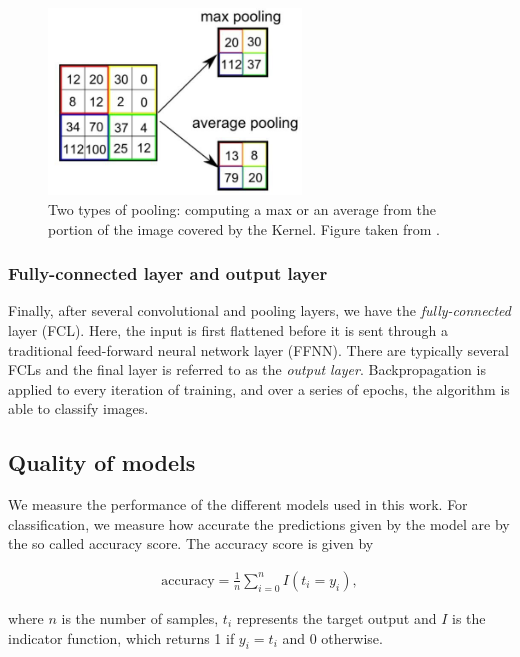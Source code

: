 \documentclass[../main.tex]{subfiles}
\begin{document}
\begin{figure}
    \centering
    \includegraphics[width=0.6\textwidth]{fig/pooling.jpeg}
    \caption{Two types of pooling: computing a max or an average from the portion of the image covered by the Kernel. Figure taken from \cite{sumit2018}.}
    \label{fig:pooling}
\end{figure}

\subsubsection{Fully-connected layer and output layer}
Finally, after several convolutional and pooling layers, we have the \textit{fully-connected} layer (FCL). Here, the input is first flattened before it is sent through a traditional feed-forward neural network layer (FFNN). There are typically several FCLs and the final layer is referred to as the \textit{output layer}. Backpropagation is applied to every iteration of training, and over a series of epochs, the algorithm is able to classify images. %

\subsection{Quality of models}
We measure the performance of the different models used in this work. For classification, we measure how accurate the predictions given by the model are by the so called accuracy score. The accuracy score is given by

\begin{align}
    \text{accuracy}=\frac{1}{n}\sum_{i=0}^nI(t_i=y_i),
    \label{eq:accuracy-score}
\end{align}

where $n$ is the number of samples, $t_i$ represents the target output and $I$ is the indicator function, which returns 1 if \ensuremath{y_i=t_i} and 0 otherwise. 
\end{document}
